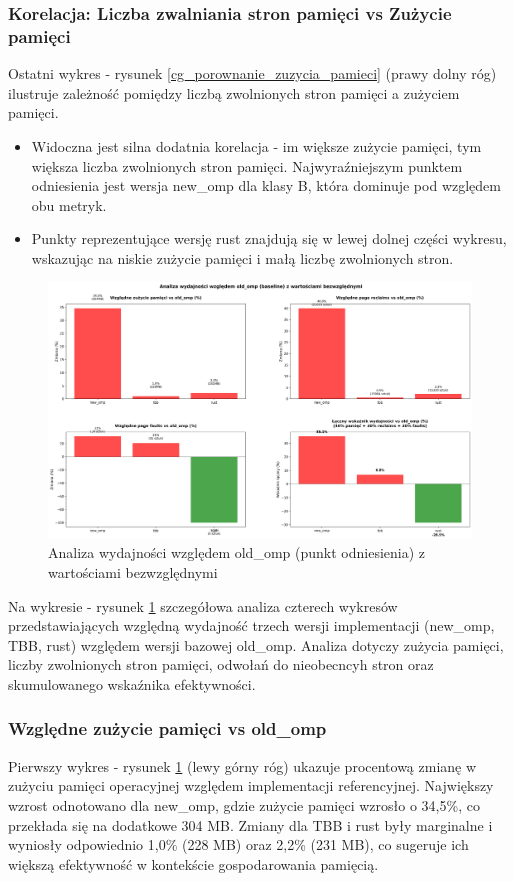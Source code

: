 \subsubsection{Korelacja: Liczba zwalniania stron pamięci vs Zużycie pamięci}
Ostatni wykres - rysunek \ref{cg_porownanie_zuzycia_pamieci} (prawy dolny róg) ilustruje zależność pomiędzy liczbą zwolnionych stron pamięci a zużyciem pamięci.
\begin{itemize}
    \item Widoczna jest silna dodatnia korelacja - im większe zużycie pamięci, tym większa liczba zwolnionych stron pamięci. Najwyraźniejszym punktem odniesienia jest wersja new\_omp dla klasy B, która dominuje pod względem obu metryk.
    \item Punkty reprezentujące wersję rust znajdują się w lewej dolnej części wykresu, wskazując na niskie zużycie pamięci i małą liczbę zwolnionych stron.
\end{itemize}

\begin{figure}[H]
    \centering
    \includegraphics[width=\textwidth]{analiza/images/parallel/cg/chart_05_performance_ratios.png}
    \caption{Analiza wydajności względem old\_omp (punkt odniesienia) z wartościami bezwzględnymi}
    \label{cg_analiza_wzgledem_old_omp}
\end{figure}
Na wykresie - rysunek \ref{cg_analiza_wzgledem_old_omp} szczegółowa analiza czterech wykresów przedstawiających względną wydajność trzech wersji implementacji (new\_omp, TBB, rust) względem wersji bazowej old\_omp. Analiza dotyczy zużycia pamięci, liczby zwolnionych stron pamięci, odwołań do nieobecncyh stron oraz skumulowanego wskaźnika efektywności.
\subsubsection{Względne zużycie pamięci vs old\_omp}
Pierwszy wykres - rysunek \ref{cg_analiza_wzgledem_old_omp} (lewy górny róg) ukazuje procentową zmianę w zużyciu pamięci operacyjnej względem implementacji referencyjnej. Największy wzrost odnotowano dla new\_omp, gdzie zużycie pamięci wzrosło o 34,5\%, co przekłada się na dodatkowe 304 MB. Zmiany dla TBB i rust były marginalne i wyniosły odpowiednio 1,0\% (228 MB) oraz 2,2\% (231 MB), co sugeruje ich większą efektywność w kontekście gospodarowania pamięcią.

